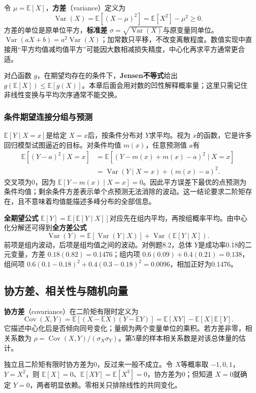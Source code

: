 \documentclass[UTF8,fontset=none,zihao=-4,a4paper]{ctexart}
\newcommand{\term}[1]{\textbf{#1}}
\numberwithin{equation}{section}
\numberwithin{figure}{section}
\begin{document}
令 $\mu=\mathbb E[X]$，\term{方差}（variance）定义为
\[
 \operatorname{Var}(X)=\mathbb E[(X-\mu)^2]
 =\mathbb E[X^2]-\mu^2\ge0.
\]
方差的单位是原单位平方，\term{标准差} $\sigma=\sqrt{\operatorname{Var}(X)}$与原变量同单位。$\operatorname{Var}(aX+b)=a^2\operatorname{Var}(X)$；加常数只平移，不改变离散程度。数值实现中直接用“平方均值减均值平方”可能因大数相减损失精度，中心化再求平方通常更合适。

对凸函数 $g$，在期望均存在的条件下，\term{Jensen不等式}给出 $g(\mathbb E[X])\le\mathbb E[g(X)]$。本章后面会用对数的凹性解释概率量；这里只需记住非线性变换与平均次序通常不能交换。

\subsubsection{条件期望连接分组与预测}
$\mathbb E[Y\mid X=x]$是给定 $X=x$后，按条件分布对 $Y$求平均。视为 $x$的函数，它是许多回归模型试图逼近的目标。对条件均值 $m(x)$，任意预测值 $a$有
\begin{align*}
 \mathbb E[(Y-a)^2\mid X=x]
 &=\mathbb E[(Y-m(x)+m(x)-a)^2\mid X=x]\\
 &=\operatorname{Var}(Y\mid X=x)+(m(x)-a)^2.
\end{align*}
交叉项为0，因为 $\mathbb E[Y-m(x)\mid X=x]=0$。因此平方误差下最优的点预测为条件均值；剩余条件方差表示单个点预测无法消除的波动。这一结论要求二阶矩存在，且不意味着均值能描述多峰分布的全部信息。

\term{全期望公式} $\mathbb E[Y]=\mathbb E[\mathbb E[Y\mid X]]$对应先在组内平均，再按组概率平均。由中心化分解还可得到\term{全方差公式}
\[
 \operatorname{Var}(Y)=\mathbb E[\operatorname{Var}(Y\mid X)]
 +\operatorname{Var}(\mathbb E[Y\mid X]).
\]
前项是组内波动，后项是组均值之间的波动。对例题8.2，总体 $Y$是成功率0.18的二元变量，方差 $0.18(0.82)=0.1476$；组内项 $0.6(0.09)+0.4(0.21)=0.138$，组间项 $0.6(0.1-0.18)^2+0.4(0.3-0.18)^2=0.0096$，相加正好为0.1476。

\subsection{协方差、相关性与随机向量}
\term{协方差}（covariance）在二阶矩有限时定义为
\[
 \operatorname{Cov}(X,Y)=\mathbb E[(X-\mathbb E X)(Y-\mathbb E Y)]
 =\mathbb E[XY]-\mathbb E[X]\mathbb E[Y].
\]
它描述中心化后是否倾向同号变化；量纲为两个变量单位的乘积。若方差非零，相关系数为 $\rho=\operatorname{Cov}(X,Y)/(\sigma_X\sigma_Y)$。第5章的样本相关系数是对该总体量的估计。

独立且二阶矩有限时协方差为0，反过来一般不成立。令 $X$等概率取 $-1,0,1$，$Y=X^2$，则 $\mathbb E[X]=0$、$\mathbb E[XY]=\mathbb E[X^3]=0$，协方差为0；但知道 $X=0$就确定 $Y=0$，两者明显依赖。零相关只排除线性的共同变化。
\end{document}
